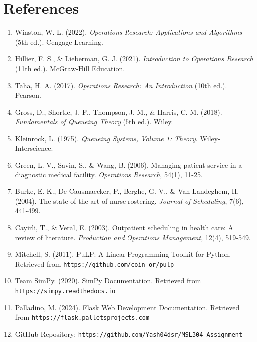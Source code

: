 \documentclass[12pt,a4paper]{article}
\begin{document}
\section{References}
\label{sec:references}

\begin{enumerate}[leftmargin=2em]
    \item Winston, W. L. (2022). \textit{Operations Research: Applications and Algorithms} (5th ed.). Cengage Learning.
    
    \item Hillier, F. S., \& Lieberman, G. J. (2021). \textit{Introduction to Operations Research} (11th ed.). McGraw-Hill Education.
    
    \item Taha, H. A. (2017). \textit{Operations Research: An Introduction} (10th ed.). Pearson.
    
    \item Gross, D., Shortle, J. F., Thompson, J. M., \& Harris, C. M. (2018). \textit{Fundamentals of Queueing Theory} (5th ed.). Wiley.
    
    \item Kleinrock, L. (1975). \textit{Queueing Systems, Volume 1: Theory}. Wiley-Interscience.
    
    \item Green, L. V., Savin, S., \& Wang, B. (2006). Managing patient service in a diagnostic medical facility. \textit{Operations Research}, 54(1), 11-25.
    
    \item Burke, E. K., De Causmaecker, P., Berghe, G. V., \& Van Landeghem, H. (2004). The state of the art of nurse rostering. \textit{Journal of Scheduling}, 7(6), 441-499.
    
    \item Cayirli, T., \& Veral, E. (2003). Outpatient scheduling in health care: A review of literature. \textit{Production and Operations Management}, 12(4), 519-549.
    
    \item Mitchell, S. (2011). PuLP: A Linear Programming Toolkit for Python. Retrieved from \texttt{https://github.com/coin-or/pulp}
    
    \item Team SimPy. (2020). SimPy Documentation. Retrieved from \texttt{https://simpy.readthedocs.io}
    
    \item Palladino, M. (2024). Flask Web Development Documentation. Retrieved from \texttt{https://flask.palletsprojects.com}
    
    \item GitHub Repository: \texttt{https://github.com/Yash04dsr/MSL304-Assignment}
\end{enumerate}
\end{document}
